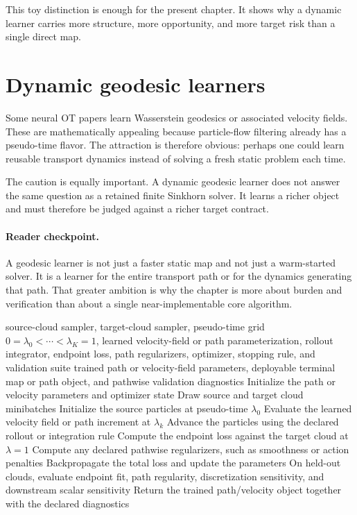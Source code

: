 This toy distinction is enough for the present chapter.  It shows why a dynamic
learner carries more structure, more opportunity, and more target risk than a
single direct map.

\section{Dynamic geodesic learners}
\label{sec:bf-neural-ot-dynamic-geodesic}

Some neural OT papers learn Wasserstein geodesics or associated velocity fields.
These are mathematically appealing because particle-flow filtering already has a
pseudo-time flavor.  The attraction is therefore obvious: perhaps one could learn
reusable transport dynamics instead of solving a fresh static problem each time.

The caution is equally important.  A dynamic geodesic learner does not answer the
same question as a retained finite Sinkhorn solver.  It learns a richer object and
must therefore be judged against a richer target contract.

\paragraph{Reader checkpoint.}
A geodesic learner is not just a faster static map and not just a warm-started
solver.  It is a learner for the entire transport path or for the dynamics
generating that path.  That greater ambition is why the chapter is more about
burden and verification than about a single near-implementable core algorithm.

\begin{algorithm}[ht]
\caption{\texttt{train\_dynamic\_transport\_path}}
\begin{algorithmic}[1]
\Require source-cloud sampler, target-cloud sampler, pseudo-time grid \(0=\lambda_0<\cdots<\lambda_K=1\), learned velocity-field or path parameterization, rollout integrator, endpoint loss, path regularizers, optimizer, stopping rule, and validation suite
\Ensure trained path or velocity-field parameters, deployable terminal map or path object, and pathwise validation diagnostics
\State Initialize the path or velocity parameters and optimizer state
  \State Draw source and target cloud minibatches
  \State Initialize the source particles at pseudo-time \(\lambda_0\)
    \State Evaluate the learned velocity field or path increment at \(\lambda_k\)
    \State Advance the particles using the declared rollout or integration rule
  \EndFor
  \State Compute the endpoint loss against the target cloud at \(\lambda=1\)
  \State Compute any declared pathwise regularizers, such as smoothness or action penalties
  \State Backpropagate the total loss and update the parameters
\EndWhile
\State On held-out clouds, evaluate endpoint fit, path regularity, discretization sensitivity, and downstream scalar sensitivity
\State Return the trained path/velocity object together with the declared diagnostics
\end{algorithmic}
\end{algorithm}

